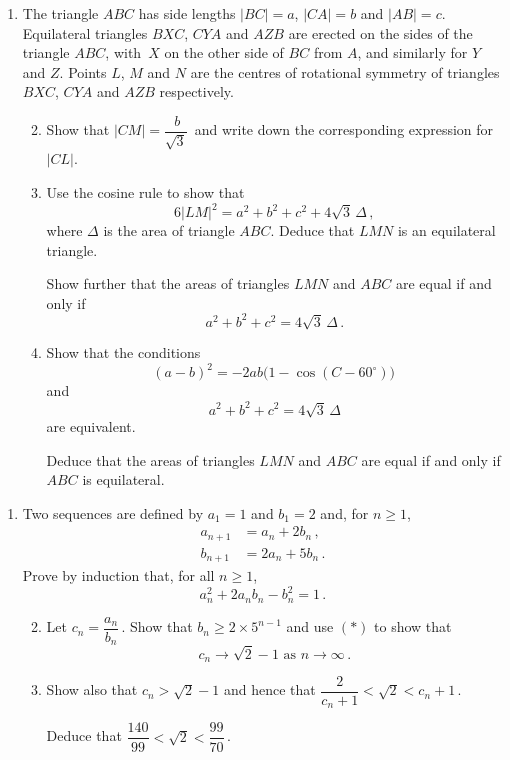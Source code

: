 \documentclass[a4, 11pt]{report}
\newlength{\qspace}
\newcounter{qnumber}
\newenvironment{question}%
 {\vspace{\qspace}
  \begin{enumerate}[\bfseries 1\quad][10]%
    \setcounter{enumi}{\value{qnumber}}%
    \item%
 }
{
  \end{enumerate}
  \filbreak
  \stepcounter{qnumber}
 }
\newenvironment{questionparts}[1][1]%
 {
  \begin{enumerate}[\bfseries (i)]%
    \setcounter{enumii}{#1}
    \addtocounter{enumii}{-1}
    \setlength{\itemsep}{5mm}
    \setlength{\parskip}{8pt}
 }
 {
  \end{enumerate}
 }
\def\ge{\geqslant}
\begin{document}
\begin{question}


The triangle $ABC$ has side lengths $\left| BC \right| = a$, 
$\left| CA \right| = b$ and $\left| AB \right| = c$.
Equilateral triangles 
$BXC$, \; $CY\!A$  \hspace{0.0mm} and  $AZB$ are erected on the sides of the  triangle $ABC$, 
with~$X$ on the other side of $BC$ from $A$, and similarly for $Y$ and $Z$. 
Points $L$, $M$ and $N$ are the centres 
of rotational symmetry of triangles $BXC$, $CY\!A$ and $AZB$ respectively. 





\begin{questionparts}
\item
Show that $| CM| =  \dfrac {\ b} {\sqrt3} \,$
and write down the corresponding expression for $| CL|$.

\item Use the cosine rule to show that
\[
6 \left| LM \right|^2 = a^2+b^2+c^2 + 4\sqrt3 \, \Delta \,,
\]
where 
$\Delta$ is the area of triangle $ABC$. 
Deduce
 that $LMN$ is an equilateral triangle.

Show further that the areas of triangles $LMN$ and $ABC$ are equal
if and only if
\[
a^2+b^2 +c^2 = 4\sqrt3 \, \Delta
\,.
\]
\item
Show that 
the conditions
\[
(a -b)^2 = -2ab \big( 1 -\cos(C-60^\circ)\big) 
\,\]
and 
\[
a^2+b^2 +c^2 = 4\sqrt3 \, \Delta
\]
are equivalent.


Deduce
that the areas of triangles $LMN$ and $ABC$ are equal
if and only if
$ABC$ is equilateral.






\end{questionparts}
\end{question}

  
\begin{question}           
 Two sequences are defined by $a_1 = 1$ and $b_1 = 2$ and, for $n \ge 1$,
\begin{equation*}
\begin{split}
a_{n+1} & = a_n+ 2b_n \,,
\\
b_{n+1} & = 2a_n + 5b_n \,. 
\end{split}
\end{equation*}
Prove by induction that, for all $n \ge 1$, 
\[
a_n^2+2a_nb_n  - b_n^2 = 1 
\,.
\tag{$*$}\]
\begin{questionparts}
\item
Let $c_n = \dfrac{a_n}{b_n}$\,.
Show that $b_n  \ge  2 \times 5^{n-1}$
and use $(*)$ to show  that  
\[
c_n \to \sqrt 2 -1 
\text{ as }  n\to\infty\,.
 \]
\item
Show also that
$c_n > \sqrt2 -1$ and hence that $\dfrac2 {c_n+1}<\sqrt2<c_n+1
$\,.

Deduce that  $\dfrac{140}{99}<   \sqrt{2} < \dfrac{99}{70 }\,$.

\end{questionparts}
\end{question}
\newpage
\end{document}
